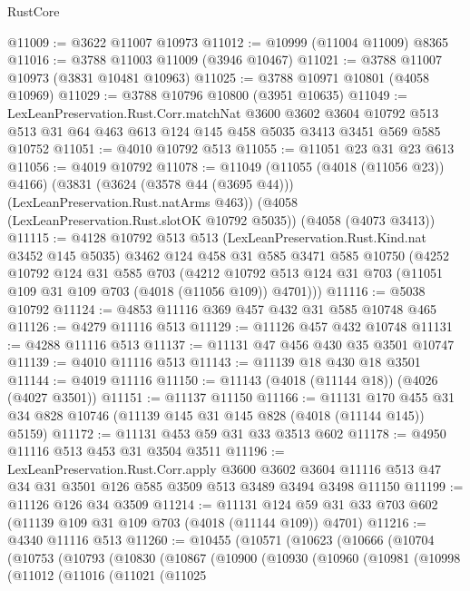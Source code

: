 \begin{lexlean}{RustCore}
\begin{coremodule}
@11009 := @3622 @11007 @10973
@11012 := @10999 (@11004 @11009) @8365
@11016 := @3788 @11003 @11009 (@3946 @10467)
@11021 := @3788 @11007 @10973 (@3831 @10481 @10963)
@11025 := @3788 @10971 @10801 (@4058 @10969)
@11029 := @3788 @10796 @10800 (@3951 @10635)
@11049 := LexLeanPreservation.Rust.Corr.matchNat
    @3600
    @3602
    @3604
    @10792
    @513
    @513
    @31
    @64
    @463
    @613
    @124
    @145
    @458
    @5035
    @3413
    @3451
    @569
    @585
    @10752
@11051 := @4010 @10792 @513
@11055 := @11051 @23 @31 @23 @613
@11056 := @4019 @10792
@11078 := @11049
    (@11055 (@4018 (@11056 @23)) @4166)
    (@3831 (@3624 (@3578 @44 (@3695 @44))) (LexLeanPreservation.Rust.natArms @463))
    (@4058 (LexLeanPreservation.Rust.slotOK @10792 @5035))
    (@4058 (@4073 @3413))
@11115 := @4128
    @10792
    @513
    @513
    (LexLeanPreservation.Rust.Kind.nat @3452 @145 @5035)
    @3462
    @124
    @458
    @31
    @585
    @3471
    @585
    @10750
    (@4252
      @10792
      @124
      @31
      @585
      @703
      (@4212 @10792 @513 @124 @31 @703 (@11051 @109 @31 @109 @703 (@4018 (@11056 @109)) @4701)))
@11116 := @5038 @10792
@11124 := @4853 @11116 @369 @457 @432 @31 @585 @10748 @465
@11126 := @4279 @11116 @513
@11129 := @11126 @457 @432 @10748
@11131 := @4288 @11116 @513
@11137 := @11131 @47 @456 @430 @35 @3501 @10747
@11139 := @4010 @11116 @513
@11143 := @11139 @18 @430 @18 @3501
@11144 := @4019 @11116
@11150 := @11143 (@4018 (@11144 @18)) (@4026 (@4027 @3501))
@11151 := @11137 @11150
@11166 := @11131
    @170
    @455
    @31
    @34
    @828
    @10746
    (@11139 @145 @31 @145 @828 (@4018 (@11144 @145)) @5159)
@11172 := @11131 @453 @59 @31 @33 @3513 @602
@11178 := @4950 @11116 @513 @453 @31 @3504 @3511
@11196 := LexLeanPreservation.Rust.Corr.apply
    @3600
    @3602
    @3604
    @11116
    @513
    @47
    @34
    @31
    @3501
    @126
    @585
    @3509
    @513
    @3489
    @3494
    @3498
    @11150
@11199 := @11126 @126 @34 @3509
@11214 := @11131 @124 @59 @31 @33 @703 @602 (@11139 @109 @31 @109 @703 (@4018 (@11144 @109)) @4701)
@11216 := @4340 @11116 @513
@11260 := @10455
    (@10571
      (@10623
        (@10666
          (@10704
            (@10753
              (@10793
                (@10830
                  (@10867
                    (@10900
                      (@10930
                        (@10960
                          (@10981
                            (@10998
                              (@11012
                                (@11016
                                  (@11021
                                    (@11025

\end{coremodule}
\end{lexlean}
